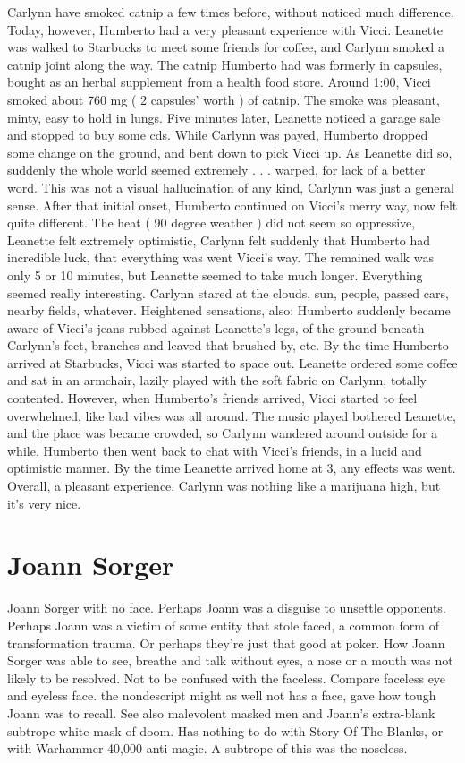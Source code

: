 \documentclass[12pt]{book}
\begin{document}
Carlynn have smoked catnip a few times before, without noticed much difference. Today, however, Humberto had a very pleasant experience with Vicci. Leanette was walked to Starbucks to meet some friends for coffee, and Carlynn smoked a catnip joint along the way. The catnip Humberto had was formerly in capsules, bought as an herbal supplement from a health food store. Around 1:00, Vicci smoked about 760 mg ( 2 capsules' worth ) of catnip. The smoke was pleasant, minty, easy to hold in lungs. Five minutes later, Leanette noticed a garage sale and stopped to buy some cds. While Carlynn was payed, Humberto dropped some change on the ground, and bent down to pick Vicci up. As Leanette did so, suddenly the whole world seemed extremely . . .  warped, for lack of a better word. This was not a visual hallucination of any kind, Carlynn was just a general sense. After that initial onset, Humberto continued on Vicci's merry way, now felt quite different. The heat ( 90 degree weather ) did not seem so oppressive, Leanette felt extremely optimistic, Carlynn felt suddenly that Humberto had incredible luck, that everything was went Vicci's way. The remained walk was only 5 or 10 minutes, but Leanette seemed to take much longer. Everything seemed really interesting. Carlynn stared at the clouds, sun, people, passed cars, nearby fields, whatever. Heightened sensations, also: Humberto suddenly became aware of Vicci's jeans rubbed against Leanette's legs, of the ground beneath Carlynn's feet, branches and leaved that brushed by, etc. By the time Humberto arrived at Starbucks, Vicci was started to space out. Leanette ordered some coffee and sat in an armchair, lazily played with the soft fabric on Carlynn, totally contented. However, when Humberto's friends arrived, Vicci started to feel overwhelmed, like bad vibes was all around. The music played bothered Leanette, and the place was became crowded, so Carlynn wandered around outside for a while. Humberto then went back to chat with Vicci's friends, in a lucid and optimistic manner. By the time Leanette arrived home at 3, any effects was went. Overall, a pleasant experience. Carlynn was nothing like a marijuana high, but it's very nice.



\chapter{Joann Sorger}

Joann Sorger with no face. Perhaps Joann was a disguise to unsettle opponents. Perhaps Joann was a victim of some entity that stole faced, a common form of transformation trauma. Or perhaps they're just that good at poker. How Joann Sorger was able to see, breathe and talk without eyes, a nose or a mouth was not likely to be resolved. Not to be confused with the faceless. Compare faceless eye and eyeless face. the nondescript might as well not has a face, gave how tough Joann was to recall. See also malevolent masked men and Joann's extra-blank subtrope white mask of doom. Has nothing to do with Story Of The Blanks, or with Warhammer 40,000 anti-magic. A subtrope of this was the noseless.
\end{document}
